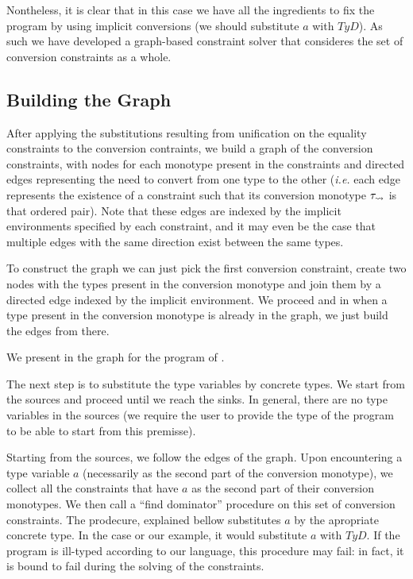Nontheless, it is clear that in this case we have all the ingredients to fix the program by using implicit conversions (we should substitute $a$ with $TyD$). As such we have developed a graph-based constraint solver that consideres the set of conversion constraints as a whole.

\subsection{Building the Graph}

After applying the substitutions resulting from unification on the equality constraints to the conversion contraints, we build a graph of the conversion constraints, with nodes for each monotype present in the constraints and directed edges representing the need to convert from one type to the other (\textit{i.e.} each edge represents the existence of a constraint such that its conversion monotype $\mathit{\tau_{\rightsquigarrow}}$ is that ordered pair). Note that these edges are indexed by the implicit environments specified by each constraint, and it may even be the case that multiple edges with the same direction exist between the same types.

To construct the graph we can just pick the first conversion constraint, create two nodes with the types present in the conversion monotype and join them by a directed edge indexed by the implicit environment. We proceed and in when a type present in the conversion monotype is already in the graph, we just build the edges from there.

We present in  the graph for the program of .

The next step is to substitute the type variables by concrete types. We start from the sources and proceed until we reach the sinks. In general, there are no type variables in the sources (we require the user to provide the type of the program to be able to start from this premisse).

Starting from the sources, we follow the edges of the graph. Upon encountering a type variable $a$ (necessarily as the second part of the conversion monotype), we collect all the constraints that have $a$ as the second part of their conversion monotypes. We then call a ``find dominator'' procedure on this set of conversion constraints. The prodecure, explained bellow substitutes $a$ by the apropriate concrete type. In the case or our example, it would substitute $a$ with $TyD$. If the program is ill-typed according to our language, this procedure may fail: in fact, it is bound to fail during the solving of the constraints.

